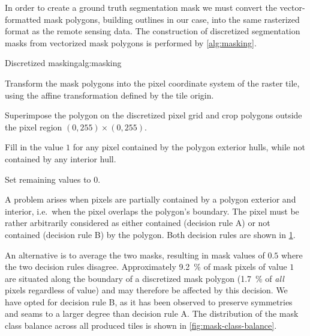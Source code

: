 In order to create a ground truth segmentation mask we must convert the vector-formatted mask polygons, building outlines in our case, into the same rasterized format as the remote sensing data.
The construction of discretized segmentation masks from vectorized mask polygons is performed by \cref{alg:masking}.

\begin{algorithm}{Discretized masking}{alg:masking}
  \item Transform the mask polygons into the pixel coordinate system of the raster tile, using the affine transformation defined by the tile origin.
  \item Superimpose the polygon on the discretized pixel grid and crop polygons outside the pixel region $(0, 255) \times (0, 255)$.
  \item Fill in the value $1$ for any pixel contained by the polygon exterior hulls, while not contained by any interior hull.
  \item Set remaining values to $0$.
\end{algorithm}

A problem arises when pixels are partially contained by a polygon exterior and interior, i.e.\ when the pixel overlaps the polygon's boundary.
The pixel must be rather arbitrarily considered as either contained (decision rule A) or not contained (decision rule B) by the polygon.
Both decision rules are shown in \cref{fig:pixel-containment}.

\begin{figure}[H]
  \centering
  
  \hspace{2em}
  
  \label{fig:pixel-containment}
\end{figure}

\clearpage
An alternative is to average the two masks, resulting in mask values of $0.5$ where the two decision rules disagree.
Approximately \SI{9.2}{\percent} of mask pixels of value $1$ are situated along the boundary of a discretized mask polygon (\SI{1.7}{\percent} of \textit{all} pixels regardless of value) and may therefore be affected by this decision.
We have opted for decision rule B, as it has been observed to preserve symmetries and seams to a larger degree than decision rule A.
The distribution of the mask class balance across all produced tiles is shown in \cref{fig:mask-class-balance}.

